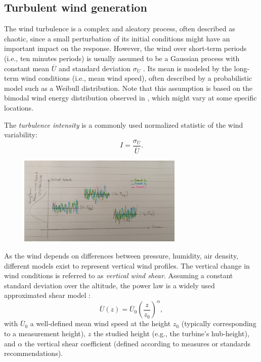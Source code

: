 


\subsection{Turbulent wind generation}

The wind turbulence is a complex and aleatory process, often described as chaotic, since a small perturbation of its initial conditions might have an important impact on the response. 
However, the wind over short-term periods (i.e., ten minutes periods) is usually assumed to be a Gaussian process with constant mean $\overline{U}$ and standard deviation $\sigma_U$ \citep{burton_2021_wind_handbook}. 
Its mean is modeled by the long-term wind conditions (i.e., mean wind speed), often described by a probabilistic model such as a Weibull distribution. 
Note that this assumption is based on the bimodal wind energy distribution observed in , which might vary at some specific locations. 

The \textit{turbulence intensity} is a commonly used normalized statistic of the wind variability: 
\begin{equation}
    I = \frac{\sigma_U}{\overline{U}}.
\end{equation}

\begin{figure}
    \centering
    \includegraphics[width=0.7\textwidth]{./part1/figures/wind_long_short_term.jpg}
    \label{fig:wind_long_short_term}
    \caption{}
\end{figure}

As the wind depends on differences between pressure, humidity, air density, different models exist to represent vertical wind profiles. 
The vertical change in wind conditions is referred to as \textit{vertical wind shear}.
Assuming a constant standard deviation over the altitude, the power law is a widely used approximated shear model \citep{iec_2019}:
\begin{equation}
    \overline{U}(z) = \overline{U}_0 \left(\frac{z}{z_{\mathrm{0}}}\right)^\alpha,
\end{equation}
with $\overline{U}_0$ a well-defined mean wind speed at the height $z_{\mathrm{0}}$ (typically corresponding to a measurement height), 
$z$ the studied height (e.g., the turbine's hub-height), and $\alpha$ the vertical shear coefficient (defined according to measures or standards recommendations). 

